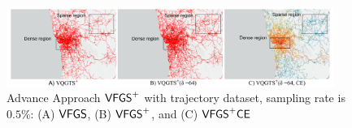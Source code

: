 \begin{figure}[t]
	\centering
	\includegraphics[width=0.95\textwidth]{pictures/problemsolveing/delta_motivation.pdf}
	\caption{Advance Approach $\mathsf{VFGS}^{+}$ with \pt{} trajectory dataset, sampling rate is $0.5\%$: (A) $\mathsf{VFGS}{}$, (B) $\mathsf{VFGS}^{+}$, and (C) $\mathsf{VFGS}^{+}\mathsf{CE}$}
	\label{fig:delta}
\end{figure}




